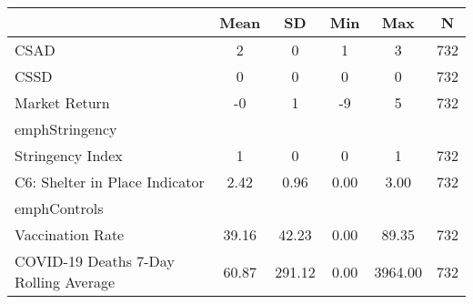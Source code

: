 \begin{tabular}{l*{1}{ccccc}}
\toprule
                &     Mean&       SD&      Min&      Max&        N\\
\midrule
CSAD            &        2&        0&        1&        3&      732\\
CSSD            &        0&        0&        0&        0&      732\\
Market Return   &       -0&        1&       -9&        5&      732\\
\vspace{0.1em} emph{Stringency}&         &         &         &         &         \\
Stringency Index&        1&        0&        0&        1&      732\\
C6: Shelter in Place Indicator&     2.42&     0.96&     0.00&     3.00&      732\\
\vspace{0.1em} emph{Controls}&         &         &         &         &         \\
Vaccination Rate&    39.16&    42.23&     0.00&    89.35&      732\\
COVID-19 Deaths 7-Day Rolling Average&    60.87&   291.12&     0.00&  3964.00&      732\\
\bottomrule
\end{tabular}

